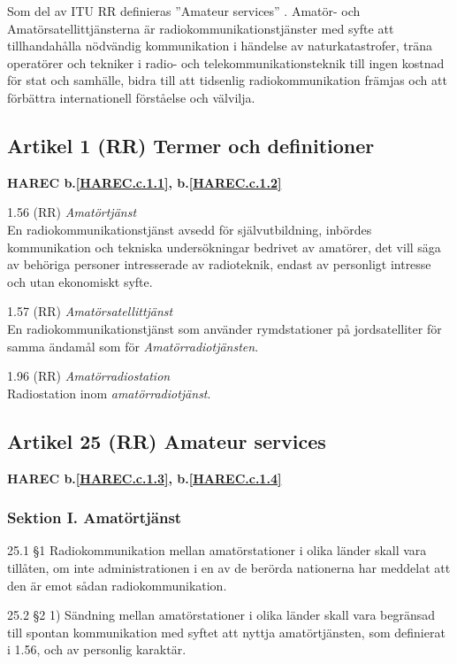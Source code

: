 Som del av ITU RR definieras ''Amateur services'' \cite[Article 25]{ITU-RR}.
Amatör- och Amatörsatellittjänsterna är radiokommunikationstjänster
med syfte att tillhandahålla nödvändig kommunikation i händelse av
naturkatastrofer, träna operatörer och tekniker i radio- och
telekommunikationsteknik till ingen kostnad för stat och samhälle,
bidra till att tidsenlig radiokommunikation främjas och att förbättra
internationell förståelse och välvilja.

\subsection{Artikel 1 (RR) Termer och definitioner}
\textbf{
HAREC b.\ref{HAREC.c.1.1}\label{myHAREC.c.1.1},
 b.\ref{HAREC.c.1.2}\label{myHAREC.c.1.2}
}

1.56 (RR) \emph{Amatörtjänst} \cite[1.56]{ITU-RR}\\
En radiokommunikationstjänst avsedd för självutbildning, inbördes
kommunikation och tekniska undersökningar bedrivet av amatörer, det
vill säga av behöriga personer intresserade av radioteknik,
endast av personligt intresse och utan ekonomiskt syfte.

1.57 (RR) \emph{Amatörsatellittjänst} \cite[1.57]{ITU-RR}\\
En radiokommunikationstjänst som använder rymdstationer på
jordsatelliter för samma ändamål som för \emph{Amatörradiotjänsten}.

1.96 (RR) \emph{Amatörradiostation} \cite[1.96]{ITU-RR}\\
Radiostation inom \emph{amatörradiotjänst}.

\subsection{Artikel 25 (RR) Amateur services}
\textbf{
HAREC b.\ref{HAREC.c.1.3}\label{myHAREC.c.1.3},
 b.\ref{HAREC.c.1.4}\label{myHAREC.c.1.4}
}

\subsubsection{Sektion I. Amatörtjänst}
25.1 §1 Radiokommunikation mellan amatörstationer i olika länder
skall vara tillåten, om inte administrationen i en av de berörda
nationerna har meddelat att den är emot sådan radiokommunikation.
\cite[25.1]{ITU-RR}

25.2 §2 1) Sändning mellan amatörstationer i olika länder skall vara
begränsad till spontan kommunikation med syftet att nyttja amatörtjänsten,
som definierat i 1.56, och av personlig karaktär.
\cite[25.2]{ITU-RR}

